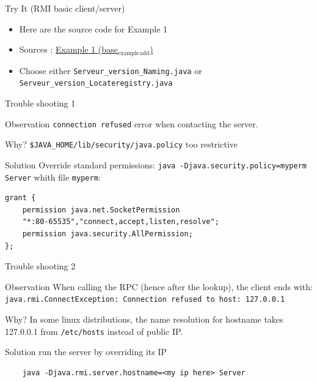 \documentclass[bigger,hyperref={colorlinks=true, urlcolor=red, plainpages=false, pdfpagelabels, bookmarksnumbered}]{beamer}
\begin{document}
\begin{frame}[fragile,label=sec-3-12]{Try It (RMI basic client/server)}
 \begin{itemize}
\item Here are the source code for Example 1
\item Sources : \href{http://icps.u-strasbg.fr/people/genaud/public_html/courses/sd/src/rmi/rmi_base_example_add.tar.gz}{Example 1 (base$_{\text{example}}$$_{\text{add}}$)}
\item Choose either \texttt{Serveur\_version\_Naming.java} or \texttt{Serveur\_version\_Locateregistry.java}
\end{itemize}
\end{frame}

\begin{frame}[fragile,label=sec-3-13]{Trouble shooting 1}
 \begin{block}{Observation}
\texttt{connection refused} error when contacting the server.
\end{block}
\begin{block}{Why?}
\texttt{\$JAVA\_HOME/lib/security/java.policy} too restrictive 
\end{block}
\begin{block}{Solution}
Override standard permissions: 
\texttt{java -Djava.security.policy=myperm Server}
whith file \texttt{myperm}:

\lstset{language=java,label= ,caption= ,numbers=none}
\begin{lstlisting}
grant {
    permission java.net.SocketPermission
    "*:80-65535","connect,accept,listen,resolve";
    permission java.security.AllPermission;
};
\end{lstlisting}
\end{block}
\end{frame}

\begin{frame}[fragile,label=sec-3-14]{Trouble shooting 2}
 \begin{block}{Observation}
When calling the RPC (hence after the lookup), the client ends with:
\texttt{java.rmi.ConnectException: Connection refused to host: 127.0.0.1}
\end{block}

\begin{block}{Why?}
In some linux distributions, the name resolution for hostname
takes 127.0.0.1 from \texttt{/etc/hosts} instead of public IP.
\end{block}

\begin{block}{Solution}
run the server by overriding its IP
\lstset{language=java,label= ,caption= ,numbers=none}
\begin{lstlisting}
    java -Djava.rmi.server.hostname=<my ip here> Server
\end{lstlisting}
\end{block}
\end{frame}
\end{document}
